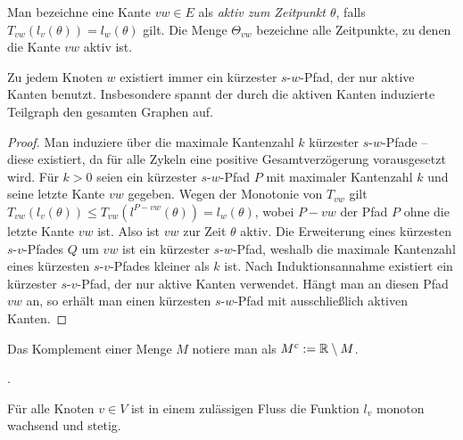 \begin{definition}
	Man bezeichne eine Kante $vw\in E$ als \emph{aktiv zum Zeitpunkt $\theta$}, falls $T_{vw}(l_v(\theta)) = l_w(\theta)$ gilt.
	Die Menge $\Theta_{vw}$ bezeichne alle Zeitpunkte, zu denen die Kante $vw$ aktiv ist.
\end{definition}

\begin{lemma}
	Zu jedem Knoten $w$ existiert immer ein kürzester $s$-$w$-Pfad, der nur aktive Kanten benutzt.
	Insbesondere spannt der durch die aktiven Kanten induzierte Teilgraph den gesamten Graphen auf.
\end{lemma}
\begin{proof}
	Man induziere über die maximale Kantenzahl $k$ kürzester $s$-$w$-Pfade -- diese existiert, da für alle Zykeln eine positive Gesamtverzögerung vorausgesetzt wird.
	Für $k>0$ seien ein kürzester $s$-$w$-Pfad $P$ mit maximaler Kantenzahl $k$ und seine letzte Kante $vw$ gegeben.
	Wegen der Monotonie von $T_{vw}$ gilt $T_{vw}(l_v(\theta)) \leq T_{vw}(l^{P-vw}(\theta)) = l_w(\theta)$, wobei $P-vw$ der Pfad $P$ ohne die letzte Kante $vw$ ist.
	Also ist $vw$ zur Zeit $\theta$ aktiv.
	Die Erweiterung eines kürzesten $s$-$v$-Pfades $Q$ um $vw$ ist ein kürzester $s$-$w$-Pfad, weshalb die maximale Kantenzahl eines kürzesten $s$-$v$-Pfades kleiner als $k$ ist.
	Nach Induktionsannahme existiert ein kürzester $s$-$v$-Pfad, der nur aktive Kanten verwendet.
	Hängt man an diesen Pfad $vw$ an, so erhält man einen kürzesten $s$-$w$-Pfad mit ausschließlich aktiven Kanten.
\end{proof}

\begin{notation}
	Das Komplement einer Menge $M$ notiere man als $M^c:= \mathbb{R}\setminus M$.
\end{notation}

.

\begin{lemma}
	Für alle Knoten $v\in V$ ist in einem zulässigen Fluss die Funktion $l_v$ monoton wachsend und stetig.
\end{lemma}


